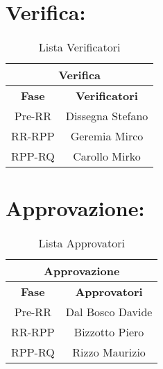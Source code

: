 \section*{\LARGE Verifica:}

\begin{table}[!h]
	\begin{center}
		\begin{tabular}
			{|c|c|}
			\hline
			\multicolumn{2}{|c|}{ \textbf{Verifica} } \\
			\hline
			\textbf{Fase} & \textbf{Verificatori} \\
			\hline
			{Pre-RR} &  Dissegna Stefano \\
			\hline
			{RR-RPP} & Geremia Mirco \\
			\hline
			{RPP-RQ} & Carollo Mirko\\
			\hline
		\end{tabular}
		\caption{Lista Verificatori} %
		\label{tabverifica}
	\end{center}
\end{table}
	
\section*{\LARGE Approvazione:}

\begin{table}[!h]
	\begin{center}
		\begin{tabular}
			{|c|c|}
			\hline
			\multicolumn{2}{|c|}{ \textbf{Approvazione} } \\
			\hline
			\textbf{Fase} & \textbf{Approvatori} \\
			\hline
			{Pre-RR} &  Dal Bosco Davide \\
			\hline
			{RR-RPP} & Bizzotto Piero \\
			\hline
			{RPP-RQ} & Rizzo Maurizio\\
			\hline
		\end{tabular}
		\caption{Lista Approvatori} %
		\label{tabapprovazione}
	\end{center}
\end{table}
\textbf{}

